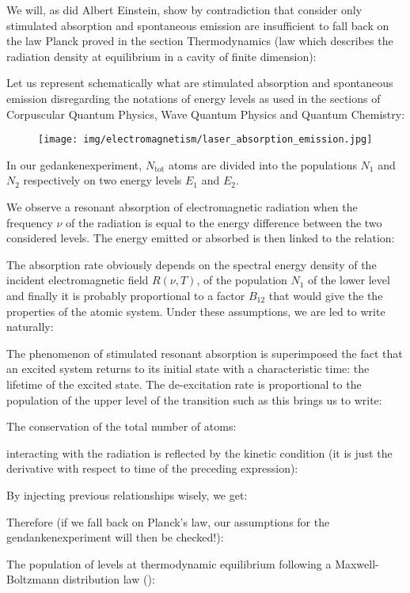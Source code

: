 	We will, as did Albert Einstein, show by contradiction that consider only stimulated absorption and spontaneous emission are insufficient to fall back on the law Planck proved in the section Thermodynamics (law which describes the radiation density at equilibrium in a cavity of finite dimension):
	
	Let us represent schematically what are stimulated absorption and spontaneous emission disregarding the notations of energy levels as used in the sections of Corpuscular Quantum Physics, Wave Quantum Physics and Quantum Chemistry:
	\begin{figure}[H]
		\centering
		\texttt{[image: img/electromagnetism/laser\_absorption\_emission.jpg]}
	\end{figure}
	In our gedankenexperiment, $N_\text{tot}$ atoms are divided into the populations $N_1$ and $N_2$ respectively on two energy levels $E_1$ and $E_2$.

	We observe a resonant absorption of electromagnetic radiation when the frequency $\nu$ of the radiation is equal to the energy difference between the two considered levels. The energy emitted or absorbed is then linked to the relation:
	
	The absorption rate obviously depends on the spectral energy density of the incident electromagnetic field $R(\nu,T)$, of the population $N_1$ of the lower level and finally it is probably proportional to a factor $B_{12}$ that would give the the properties of the atomic system. Under these assumptions, we are led to write naturally:
	
	The phenomenon of stimulated resonant absorption is superimposed the fact that an excited system returns to its initial state with a characteristic time: the lifetime of the excited state. The de-excitation rate is proportional to the population of the upper level of the transition such as this brings us to write:
	
	The conservation of the total number of atoms:
	
	interacting with the radiation is reflected by the kinetic condition (it is just the derivative with respect to time of the preceding expression):
	
	By injecting previous relationships wisely, we get:
	
	Therefore (if we fall back on Planck's law, our assumptions for the gendankenexperiment will then be checked!):
	
	The population of levels at thermodynamic equilibrium following a Maxwell-Boltzmann distribution law ():
	
